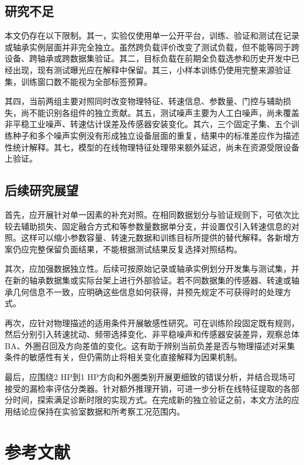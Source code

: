 \documentclass[UTF8,12pt,openany,twoside]{ctexbook}
\numberwithin{equation}{chapter}
\begin{document}
\section{研究不足}\label{ux7814ux7a76ux4e0dux8db3}

本文仍存在以下限制。其一，实验仅使用单一公开平台，训练、验证和测试在记录或轴承实例层面并非完全独立。虽然跨负载评价改变了测试负载，但不能等同于跨设备、跨轴承或跨数据集验证。其二，目标负载在前期全负载选参和历史开发中已经出现，现有测试曝光应在解释中保留。其三，小样本训练仍使用完整来源验证集，训练窗口数不能视为全部标签预算。

其四，当前两组主要对照同时改变物理特征、转速信息、参数量、门控与辅助损失，尚不能识别各组件的独立贡献。其五，测试噪声主要为人工白噪声，尚未覆盖非平稳工业噪声、转速估计误差及传感器安装变化。其六，三个固定子集、五个训练种子和多个噪声实例没有形成独立设备层面的重复，结果中的标准差应作为描述性统计解释。其七，模型的在线物理特征处理带来额外延迟，尚未在资源受限设备上验证。

\section{后续研究展望}\label{ux540eux7eedux7814ux7a76ux5c55ux671b}

首先，应开展针对单一因素的补充对照。在相同数据划分与验证规则下，可依次比较去辅助损失、固定融合方式和等参数量数据单分支，并设置仅引入转速信息的对照。这样可以缩小参数容量、转速元数据和训练目标所提供的替代解释。各新增方案仍应完整保留负面结果，不能根据测试结果反复选择对照结构。

其次，应加强数据独立性。后续可按原始记录或轴承实例划分开发集与测试集，并在新的轴承数据集或实际台架上进行外部验证。若不同数据集的传感器、转速或轴承几何信息不一致，应明确这些信息如何获得，并预先规定不可获得时的处理方式。

再次，应针对物理描述的适用条件开展敏感性研究。可在训练阶段固定既有规则，然后分别引入转速扰动、频带选择变化、非平稳噪声和传感器安装差异，观察总体BA、外圈召回及方向差值的变化。这有助于辨别当前负差是否与物理描述对采集条件的敏感性有关，但仍需防止将相关变化直接解释为因果机制。

最后，应围绕2 HP到1 HP方向和外圈类别开展更细致的错误分析，并结合现场可接受的漏检率评估分类器。针对额外推理开销，可进一步分析在线特征提取的各部分时间，探索满足诊断时限的实现方式。在完成新的独立验证之前，本文方法的应用结论应保持在实验室数据和所考察工况范围内。

\chapter*{参考文献}\label{ux53c2ux8003ux6587ux732e}
\end{document}
